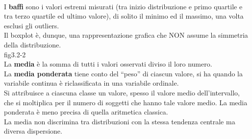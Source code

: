 \documentclass[drafts, 10pt]{book}
\begin{document}
\\
I \textbf{baffi} sono i valori estremi misurati (tra inizio distribuzione e primo quartile e tra terzo quartile ed ultimo valore), di solito il minimo ed il massimo, una volta esclusi gli outliers.
\\
Il boxplot è, dunque, una rappresentazione grafica che NON assume la simmetria della distribuzione.
\\
fig3.2-2\label{fig3.2-2}
\\
La \textbf{media} è la somma di tutti i valori osservati diviso il loro numero.
\\
La \textbf{media ponderata} tiene conto del “peso” di ciascun valore, si ha quando la variabile continua è riclassificata in una variabile ordinale.
\\
Si attribuisce a ciascuna classe un valore, spesso il valore medio dell’intervallo, che si moltiplica per il numero di soggetti che hanno tale valore medio. La media ponderata è meno precisa di quella aritmetica classica.
\\
La media non discrimina tra distribuzioni con la stessa tendenza centrale ma diversa dispersione.
\end{document}
